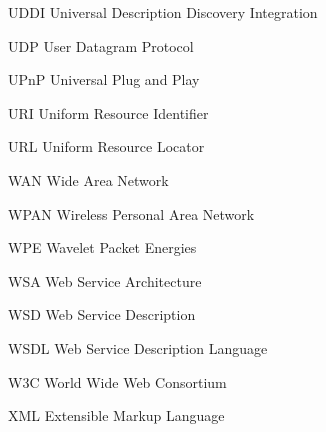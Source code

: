   {UDDI}
  {Universal Description Discovery Integration}

  {UDP}
  {User Datagram Protocol}

  {UPnP}
  {Universal Plug and Play}

  {URI}
  {Uniform Resource Identifier}

  {URL}
  {Uniform Resource Locator}

  {WAN}
  {Wide Area Network}

  {WPAN}
  {Wireless Personal Area Network}

  {WPE}
  {Wavelet Packet Energies}

  {WSA}
  {Web Service Architecture}

  {WSD}
  {Web Service Description}

  {WSDL}
  {Web Service Description Language}

  {W3C}
  {World Wide Web Consortium}

  {XML}
  {Extensible Markup Language}
